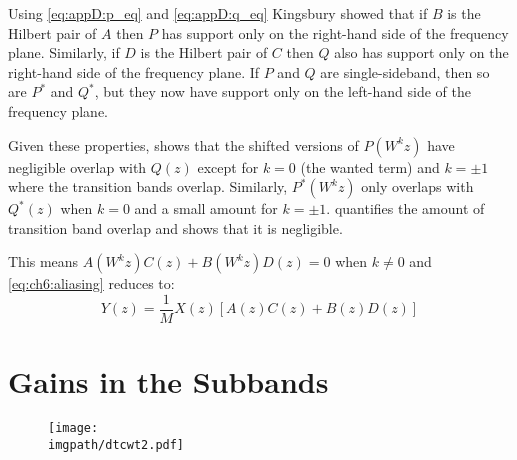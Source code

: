 Using \eqref{eq:appD:p_eq} and \eqref{eq:appD:q_eq} Kingsbury showed that if $B$ is the Hilbert pair
of $A$ then $P$ has support only on the right-hand side of the frequency plane.
Similarly, if $D$ is the Hilbert pair of $C$ then $Q$ also has support only on
the right-hand side of the frequency plane. If $P$ and $Q$ are single-sideband,
then so are $P^*$ and $Q^*$, but they now have support only on the left-hand
side of the frequency plane. 

Given these properties, \cite[figure 5]{kingsbury_complex_2001} shows that the
shifted versions of $P(W^k z)$ have negligible overlap with $Q(z)$ except for
$k=0$ (the wanted term) and $k=\pm 1$ where the transition bands overlap.
Similarly, $P^*(W^k z)$ only overlaps with $Q^*(z)$ when $k=0$ and a small amount
for $k = \pm 1$. \cite{kingsbury_complex_2001} quantifies the amount of transition
band overlap and shows that it is negligible.

This means $A(W^k z)C(z) + B(W^k z)D(z) = 0$ when $k\neq 0$ and 
\eqref{eq:ch6:aliasing} reduces to:
\begin{equation}
  Y(z) =  \frac{1}{M} X(z)\left[ A(z)C(z) + B(z)D(z) \right]
  \label{eq:ch6:aliasing_cancel} 
\end{equation}

\section{Gains in the Subbands}
\begin{figure}[t]
  \centering
  \texttt{[image: \\imgpath/dtcwt2.pdf]}
  \label{fig:ch6:dtcwt_two_tree_gain}
\end{figure}


